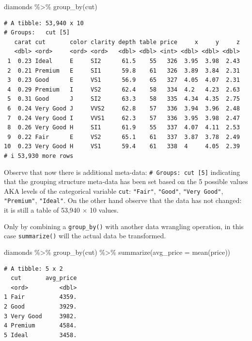 \documentclass[
  letterpaper,
  DIV=11,
  numbers=noendperiod]{scrreprt}
\newenvironment{Shaded}{\begin{snugshade}}{\end{snugshade}}
\newcommand{\AttributeTok}[1]{\textcolor[rgb]{0.40,0.45,0.13}{#1}}
\newcommand{\FunctionTok}[1]{\textcolor[rgb]{0.28,0.35,0.67}{#1}}
\newcommand{\NormalTok}[1]{\textcolor[rgb]{0.00,0.23,0.31}{#1}}
\newcommand{\SpecialCharTok}[1]{\textcolor[rgb]{0.37,0.37,0.37}{#1}}
\theoremstyle{definition}
\theoremstyle{remark}
\begin{document}
\begin{Shaded}
\begin{Highlighting}[]
\NormalTok{diamonds }\SpecialCharTok{\%\textgreater{}\%} 
  \FunctionTok{group\_by}\NormalTok{(cut)}
\end{Highlighting}
\end{Shaded}

\begin{verbatim}
# A tibble: 53,940 x 10
# Groups:   cut [5]
   carat cut       color clarity depth table price     x     y     z
   <dbl> <ord>     <ord> <ord>   <dbl> <dbl> <int> <dbl> <dbl> <dbl>
 1  0.23 Ideal     E     SI2      61.5    55   326  3.95  3.98  2.43
 2  0.21 Premium   E     SI1      59.8    61   326  3.89  3.84  2.31
 3  0.23 Good      E     VS1      56.9    65   327  4.05  4.07  2.31
 4  0.29 Premium   I     VS2      62.4    58   334  4.2   4.23  2.63
 5  0.31 Good      J     SI2      63.3    58   335  4.34  4.35  2.75
 6  0.24 Very Good J     VVS2     62.8    57   336  3.94  3.96  2.48
 7  0.24 Very Good I     VVS1     62.3    57   336  3.95  3.98  2.47
 8  0.26 Very Good H     SI1      61.9    55   337  4.07  4.11  2.53
 9  0.22 Fair      E     VS2      65.1    61   337  3.87  3.78  2.49
10  0.23 Very Good H     VS1      59.4    61   338  4     4.05  2.39
# i 53,930 more rows
\end{verbatim}

Observe that now there is additional meta-data:
\texttt{\#\ Groups:\ cut\ {[}5{]}} indicating that the grouping
structure meta-data has been set based on the 5 possible values AKA
levels of the categorical variable \texttt{cut}: \texttt{"Fair"},
\texttt{"Good"}, \texttt{"Very\ Good"}, \texttt{"Premium"},
\texttt{"Ideal"}. On the other hand observe that the data has not
changed: it is still a table of 53,940 \(\times\) 10 values.

Only by combining a \texttt{group\_by()} with another data wrangling
operation, in this case \texttt{summarize()} will the actual data be
transformed.

\begin{Shaded}
\begin{Highlighting}[]
\NormalTok{diamonds }\SpecialCharTok{\%\textgreater{}\%} 
  \FunctionTok{group\_by}\NormalTok{(cut) }\SpecialCharTok{\%\textgreater{}\%} 
  \FunctionTok{summarize}\NormalTok{(}\AttributeTok{avg\_price =} \FunctionTok{mean}\NormalTok{(price))}
\end{Highlighting}
\end{Shaded}

\begin{verbatim}
# A tibble: 5 x 2
  cut       avg_price
  <ord>         <dbl>
1 Fair          4359.
2 Good          3929.
3 Very Good     3982.
4 Premium       4584.
5 Ideal         3458.
\end{verbatim}
\end{document}
